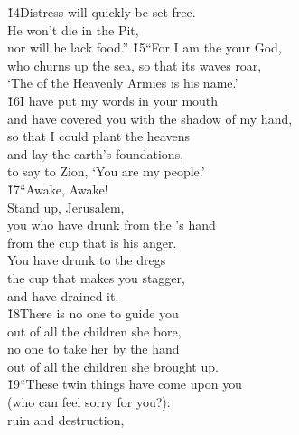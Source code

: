 \begin{poetry}
\poeml \v{14}Distress will quickly be set free. \\
\poemll    He won't die in the Pit, \\
\poemlll       nor will he lack food.''
\poeml \v{15}``For I am the  your God, \\
\poemll    who churns up the sea, so that its waves roar, \\
\poemlll       `The  of the Heavenly Armies is his name.' \\
\poeml \v{16}I have put my words in your mouth \\
\poemll    and have covered you with the shadow of my hand, \\
\poeml so that I could plant the heavens \\
\poemll    and lay the earth's foundations, \\
\poemlll       to say to Zion, `You are my people.' \\
\poeml \v{17}``Awake, Awake! \\
\poemll    Stand up, Jerusalem, \\
\poeml you who have drunk from the 's hand \\
\poemll    from the cup that is his anger. \\
\poeml You have drunk to the dregs \\
\poemll    the cup that makes you stagger, \\
\poemlll       and have drained it. \\
\poeml \v{18}There is no one to guide you \\
\poemll    out of all the children she bore, \\
\poeml no one to take her by the hand \\
\poemll    out of all the children she brought up. \\
\poeml \v{19}``These twin things have come upon you \\
\poemll    (who can feel sorry for you?): \\
\poeml ruin and destruction, \\

\end{poetry}
